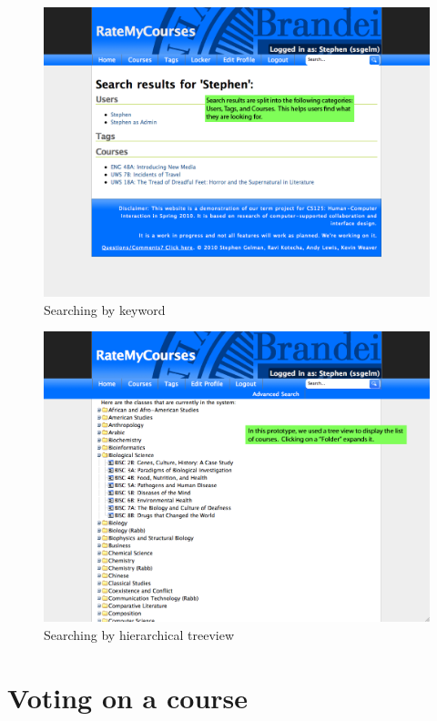 \documentclass[12pt]{report}
\begin{document}
\begin{figure}
\includegraphics[width=\textwidth]{narrative-2.png}
\caption{Searching by keyword}
\label{fig:search-keyword}
\end{figure}

\begin{figure}
\includegraphics[width=\textwidth]{narrative-3.png}
\caption{Searching by hierarchical treeview}
\label{fig:search-treeview}
\end{figure}

\section{Voting on a course}
\end{document}
